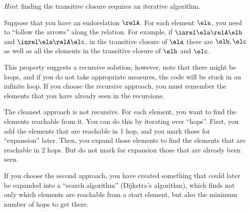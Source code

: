 
\emph{Hint}: finding the transitive closure requires an iterative algorithm.

Suppose that you have an endorelation $\relA$.
For each element $\ela$, you need to ``follow the arrows'' along the relation.
For example, if  $\inrel \ela \relA \elb$ and  $\inrel \ela \relA \elc$, in the transitive closure of $\ela$ there are $\elb, \elc$ as well as all the elements in the transitive closure of $\elb$ and $\elc$.

This property suggests a recursive solution; however, note that there might be loops, and if you do not take appropriate measures, the code will be stuck in an infinite loop.
If you choose the recursive approach, you must remember the elements that you have already seen in the recursione.

The cleanest approach is not recursive.
For each element, you want to find the elements reachable from it.
You can do this by iterating over ``hops''.
First, you add the elements that are reachable in 1 hop, and you mark those for ``expansion'' later.
Then, you expand those elements to find the elements that are reachable in 2 hops.
But do not mark for expansion those that are already been seen.

If you choose the second approach, you have created something that could later be expanded into a ``search algorithm'' (Dijkstra's algorithm), which finds not only which elements are reachable from a start element, but also the minimum number of hops to get there.
